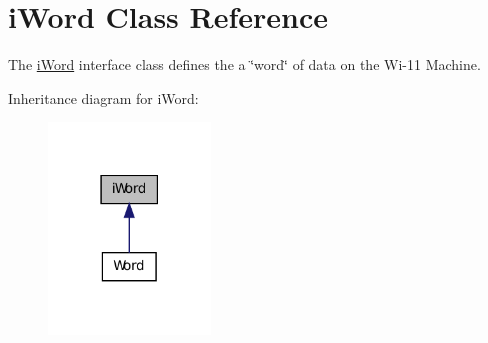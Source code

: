 \hypertarget{classiWord}{
\section{iWord Class Reference}
\label{classiWord}
}


The \hyperlink{classiWord}{iWord} interface class defines the a \char`\"{}word\char`\"{} of data on the Wi-\/11 Machine.  




Inheritance diagram for iWord:\nopagebreak
\begin{figure}[H]
\begin{center}
\leavevmode
\includegraphics[width=122pt]{classiWord__inherit__graph}
\end{center}
\end{figure}
